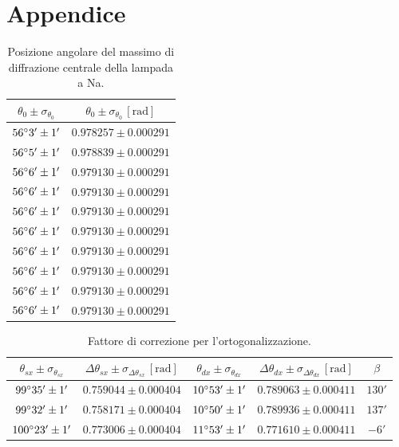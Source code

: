 \documentclass[]{article}
\let\oldsection\section%
\renewcommand{\section}{%
	\renewcommand{\theequation}{\thesection.\arabic{equation}}%
	\oldsection}%
\begin{document}
    \newpage

    \section*{Appendice}

    \begin{table}[H]
        \centering
        \begin{tabular}{||c|c||}
            \hline
            $\theta_0 \pm \sigma_{\theta_0}$ & $\theta_0 \pm \sigma_{\theta_0} \, \left[\text{rad}\right]$ \\\hline
            \hline
            $56\degree 3' \pm 1'$ & $0.978257 \pm 0.000291$ \\\hline
            $56\degree 5' \pm 1'$ & $0.978839 \pm 0.000291$ \\\hline
            $56\degree 6' \pm 1'$ & $0.979130 \pm 0.000291$ \\\hline
            $56\degree 6' \pm 1'$ & $0.979130 \pm 0.000291$ \\\hline
            $56\degree 6' \pm 1'$ & $0.979130 \pm 0.000291$ \\\hline
            $56\degree 6' \pm 1'$ & $0.979130 \pm 0.000291$ \\\hline
            $56\degree 6' \pm 1'$ & $0.979130 \pm 0.000291$ \\\hline
            $56\degree 6' \pm 1'$ & $0.979130 \pm 0.000291$ \\\hline
            $56\degree 6' \pm 1'$ & $0.979130 \pm 0.000291$ \\\hline
            $56\degree 6' \pm 1'$ & $0.979130 \pm 0.000291$ \\\hline
        \end{tabular}
        \caption{Posizione angolare del massimo di diffrazione centrale della lampada a Na.}
        \label{prel-max-c}
    \end{table}

    \begin{table}[H]
        \centering
        \begin{tabular}{||c|c|c|c|c||}
            \hline
            $\theta_{sx} \pm \sigma_{\theta_{sx}}$ & $\Delta\theta_{sx} \pm \sigma_{\Delta\theta_{sx}} \, \left[\text{rad}\right]$ & $\theta_{dx} \pm \sigma_{\theta_{dx}}$ & $\Delta\theta_{dx} \pm \sigma_{\Delta\theta_{dx}} \, \left[\text{rad}\right]$ & $\beta$ \\\hline
            \hline
            $99\degree  35' \pm 1'$ & $0.759044 \pm 0.000404$ & $10\degree 53' \pm 1'$ & $0.789063 \pm 0.000411$ & $130'$ \\\hline
            $99\degree  32' \pm 1'$ & $0.758171 \pm 0.000404$ & $10\degree 50' \pm 1'$ & $0.789936 \pm 0.000411$ & $137'$ \\\hline
            $100\degree 23' \pm 1'$ & $0.773006 \pm 0.000404$ & $11\degree 53' \pm 1'$ & $0.771610 \pm 0.000411$ & $ -6'$ \\\hline
        \end{tabular}
        \caption{Fattore di correzione per l'ortogonalizzazione.}
        \label{prel-ort}
    \end{table}
\end{document}
